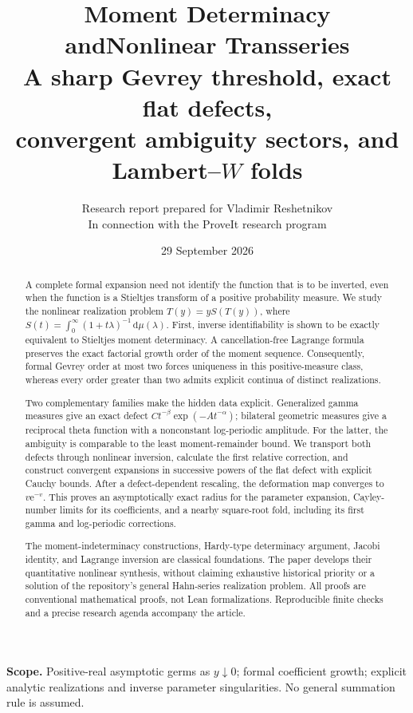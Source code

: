 \documentclass[11pt,a4paper]{article}
\title{\textbf{Moment Determinacy and\newline Nonlinear Transseries}\\[7pt]
\large A sharp Gevrey threshold, exact flat defects,\\
convergent ambiguity sectors, and Lambert--\(W\) folds}
\author{Research report prepared for Vladimir Reshetnikov\\
\small In connection with the ProveIt research program}
\date{29 September 2026}
\numberwithin{equation}{section}
\theoremstyle{definition}
\theoremstyle{remark}
\newcommand{\dd}{\,\mathrm d}
\newcommand{\ee}{\mathrm e}
\begin{document}
\maketitle
\thispagestyle{empty}
\begin{abstract}
A complete formal expansion need not identify the function that is to be
inverted, even when the function is a Stieltjes transform of a positive
probability measure. We study the nonlinear realization problem
\(T(y)=yS(T(y))\), where
\(S(t)=\int_0^\infty(1+t\lambda)^{-1}\dd\mu(\lambda)\).
First, inverse identifiability is shown to be exactly equivalent to
Stieltjes moment determinacy. A cancellation-free Lagrange formula
preserves the exact factorial growth order of the moment sequence.
Consequently, formal Gevrey order at most two forces uniqueness in this
positive-measure class, whereas every order greater than two admits
explicit continua of distinct realizations.

Two complementary families make the hidden data explicit. Generalized
gamma measures give an exact defect
\(Ct^{-\beta}\exp(-At^{-\alpha})\); bilateral geometric measures give a
reciprocal theta function with a nonconstant log-periodic amplitude.
For the latter, the ambiguity is comparable to the least moment-remainder
bound. We transport both defects through nonlinear inversion, calculate
the first relative correction, and construct convergent expansions in
successive powers of the flat defect with explicit Cauchy bounds.
After a defect-dependent rescaling, the deformation map converges to
\(v\ee^{-v}\). This proves an asymptotically exact radius for the
parameter expansion, Cayley-number limits for its coefficients, and a
nearby square-root fold, including its first gamma and log-periodic
corrections.

The moment-indeterminacy constructions, Hardy-type determinacy argument,
Jacobi identity, and Lagrange inversion are classical foundations. The
paper develops their quantitative nonlinear synthesis, without claiming
exhaustive historical priority or a solution of the repository's general
Hahn-series realization problem. All proofs are conventional mathematical
proofs, not Lean formalizations. Reproducible finite checks and a precise
research agenda accompany the article.
\end{abstract}
\vfill
\noindent\textbf{Scope.} Positive-real asymptotic germs as \(y\downarrow0\);
formal coefficient growth; explicit analytic realizations and inverse
parameter singularities. No general summation rule is assumed.
\clearpage
\tableofcontents
\clearpage
\end{document}
